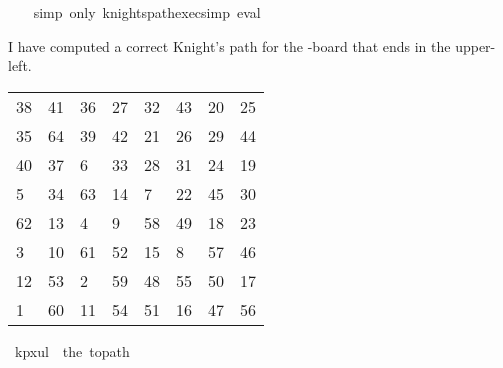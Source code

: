 \begin{isabellebody}
%
\isadelimproof
\ \ %
\endisadelimproof
%
\isatagproof
{}\isamarkupfalse%
\ {\isacharparenleft}{\kern0pt}simp\ only{\isacharcolon}{\kern0pt}\ knights{\isacharunderscore}{\kern0pt}path{\isacharunderscore}{\kern0pt}exec{\isacharunderscore}{\kern0pt}simp{\isacharparenright}{\kern0pt}\ eval%
\endisatagproof
{\isafoldproof}%
%
\isadelimproof
%
\endisadelimproof
%
\begin{isamarkuptext}%
I have computed a correct Knight's path for the -board that ends in the upper-left.
  \begin{table}[H]
    \begin{tabular}{llllllll}
      38 & 41 & 36 & 27 & 32 & 43 & 20 & 25 \\
      35 & 64 & 39 & 42 & 21 & 26 & 29 & 44 \\
      40 & 37 &  6 & 33 & 28 & 31 & 24 & 19 \\
       5 & 34 & 63 & 14 &  7 & 22 & 45 & 30 \\
      62 & 13 &  4 &  9 & 58 & 49 & 18 & 23 \\
       3 & 10 & 61 & 52 & 15 &  8 & 57 & 46 \\
      12 & 53 &  2 & 59 & 48 & 55 & 50 & 17 \\
       1 & 60 & 11 & 54 & 51 & 16 & 47 & 56
    \end{tabular}
  \end{table}%
\end{isamarkuptext}\isamarkuptrue%
\isamarkupfalse%
\ {\isachardoublequoteopen}kp{}x{}ul\ {\isasymequiv}\ the\ {\isacharparenleft}{\kern0pt}to{\isacharunderscore}{\kern0pt}path\ \isanewline
\ \ {\isacharbrackleft}{\kern0pt}{\isacharbrackleft}{\kern0pt}{}{}{\isacharcomma}{\kern0pt}{}{}{\isacharcomma}{\kern0pt}{}{}{\isacharcomma}{\kern0pt}{}{}{\isacharcomma}{\kern0pt}{}{}{\isacharcomma}{\kern0pt}{}{}{\isacharcomma}{\kern0pt}{}{}{\isacharcomma}{\kern0pt}{}{}{\isacharbrackright}{\kern0pt}{\isacharcomma}{\kern0pt}\isanewline
\ \ {\isacharbrackleft}{\kern0pt}{}{}{\isacharcomma}{\kern0pt}{}{}{\isacharcomma}{\kern0pt}{}{}{\isacharcomma}{\kern0pt}{}{}{\isacharcomma}{\kern0pt}{}{}{\isacharcomma}{\kern0pt}{}{}{\isacharcomma}{\kern0pt}{}{}{\isacharcomma}{\kern0pt}{}{}{\isacharbrackright}{\kern0pt}{\isacharcomma}{\kern0pt}\isanewline

\end{isabellebody}
